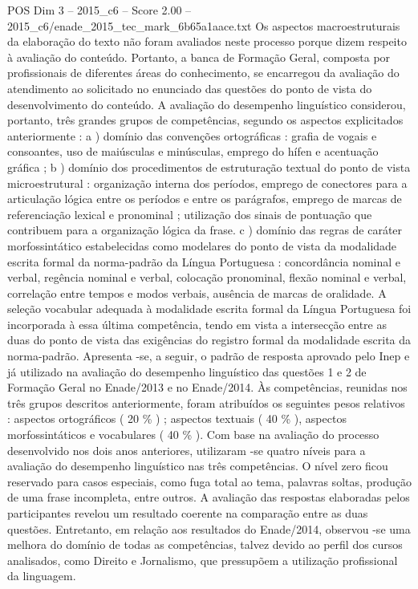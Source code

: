 \begin{textsample}{POS Dim 3 – 2015\_c6 – Score 2.00 – 2015\_c6/enade\_2015\_tec\_mark\_6b65a1aace.txt}
Os aspectos macroestruturais da elaboração do texto não foram avaliados neste processo porque dizem respeito à avaliação do conteúdo.
Portanto, a banca de Formação Geral, composta por profissionais de diferentes áreas do conhecimento, se encarregou da avaliação do atendimento ao solicitado no enunciado das questões do ponto de vista do desenvolvimento do conteúdo.
A avaliação do desempenho linguístico considerou, portanto, três grandes grupos de competências, segundo os aspectos explicitados anteriormente : a ) domínio das convenções ortográficas : grafia de vogais e consoantes, uso de maiúsculas e minúsculas, emprego do hífen e acentuação gráfica ; b ) domínio dos procedimentos de estruturação textual do ponto de vista microestrutural : organização interna dos períodos, emprego de conectores para a articulação lógica entre os períodos e entre os parágrafos, emprego de marcas de referenciação lexical e pronominal ; utilização dos sinais de pontuação que contribuem para a organização lógica da frase. c ) domínio das regras de caráter morfossintático estabelecidas como modelares do ponto de vista da modalidade escrita formal da norma-padrão da Língua Portuguesa : concordância nominal e verbal, regência nominal e verbal, colocação pronominal, flexão nominal e verbal, correlação entre tempos e modos verbais, ausência de marcas de oralidade.
A seleção vocabular adequada à modalidade escrita formal da Língua Portuguesa foi incorporada à essa última competência, tendo em vista a intersecção entre as duas do ponto de vista das exigências do registro formal da modalidade escrita da norma-padrão.
Apresenta -se, a seguir, o padrão de resposta aprovado pelo Inep e já utilizado na avaliação do desempenho linguístico das questões 1 e 2 de Formação Geral no Enade/2013 e no Enade/2014.
Às competências, reunidas nos três grupos descritos anteriormente, foram atribuídos os seguintes pesos relativos : aspectos ortográficos ( 20 \% ) ; aspectos textuais ( 40 \% ), aspectos morfossintáticos e vocabulares ( 40 \% ).
Com base na avaliação do processo desenvolvido nos dois anos anteriores, utilizaram -se quatro níveis para a avaliação do desempenho linguístico nas três competências.
O nível zero ficou reservado para casos especiais, como fuga total ao tema, palavras soltas, produção de uma frase incompleta, entre outros.
A avaliação das respostas elaboradas pelos participantes revelou um resultado coerente na comparação entre as duas questões.
Entretanto, em relação aos resultados do Enade/2014, observou -se uma melhora do domínio de todas as competências, talvez devido ao perfil dos cursos analisados, como Direito e Jornalismo, que pressupõem a utilização profissional da linguagem.

\end{textsample}
